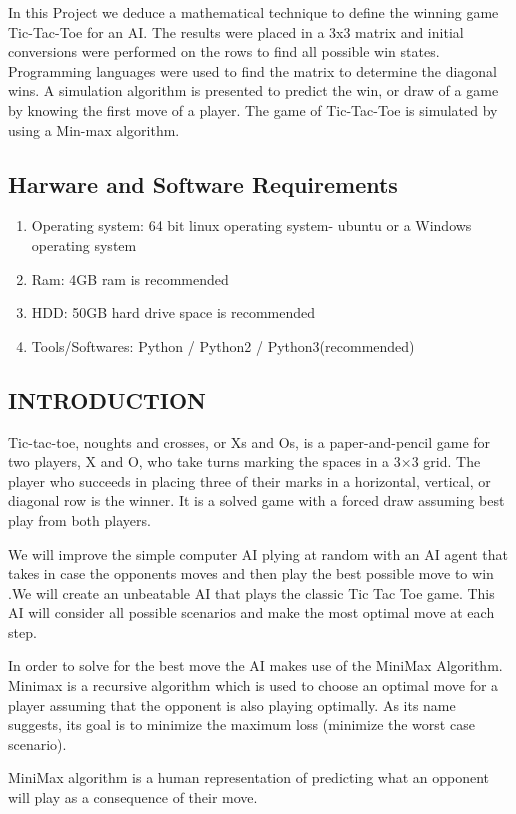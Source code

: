 \documentclass[a4paper, 12pt]{article}
\begin{document}
In this Project we deduce a mathematical technique to define the winning game Tic-Tac-Toe for an AI. The results were placed in a 3x3 matrix and initial conversions were performed on the rows to find all possible win states. Programming languages were used to find the matrix to determine the diagonal wins. A simulation algorithm is presented to predict the win, or draw of a game by knowing the first move of a player. The game of Tic-Tac-Toe is simulated by using a Min-max algorithm.

\newpage
\begin{center}
\section{Harware and Software Requirements}
\end{center}
\par
\begin{enumerate}
    \item Operating system: 64 bit linux operating system- ubuntu or a Windows operating system

    \item Ram: 4GB ram is recommended

    \item HDD: 50GB hard drive space is recommended

    \item Tools/Softwares: Python / Python2 / Python3(recommended)

\end{enumerate}
\newpage
\begin{center}
\section{INTRODUCTION}
\end{center}
\hspace{1cm}
\par
Tic-tac-toe, noughts and crosses, or Xs and Os, is a paper-and-pencil game for two players, X and O, who take turns marking the spaces in a 3×3 grid. The player who succeeds in placing three of their marks in a horizontal, vertical, or diagonal row is the winner. It is a solved game with a forced draw assuming best play from both players.
\par
We will improve the simple computer AI plying at random with an AI agent that takes in case the opponents moves and then play the best possible move to win .We will create an unbeatable AI that plays the classic Tic Tac Toe game. This AI will consider all possible scenarios and make the most optimal move at each step.
\par
 In order to solve for the best move the AI makes use of the MiniMax Algorithm. Minimax is a recursive algorithm which is used to choose an optimal move for a player assuming that the opponent is also playing optimally. As its name suggests, its goal is to minimize the maximum loss (minimize the worst case scenario).
\par
 MiniMax algorithm is a human representation of predicting what an opponent will play as a consequence of their move. 
\\
\\
\end{document}
